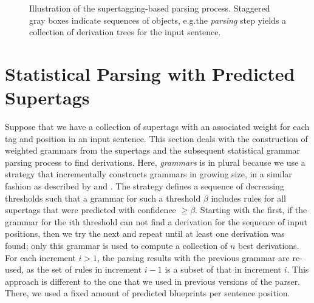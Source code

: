 \documentclass[../document.tex]{subfiles}
\begin{document}
    \begin{figure}
        
        \caption{
            Illustration of the supertagging-based parsing process.
            Staggered gray boxes indicate sequences of objects, e.g.\@ the \emph{parsing} step yields a collection of derivation trees for the input sentence.
        }
    \end{figure}

    \section{Statistical Parsing with Predicted Supertags}\label{sec:parsing}
    Suppose that we have a collection of supertags with an associated weight for each tag and position in an input sentence.
    This section deals with the construction of weighted grammars from the supertags and the subsequent statistical grammar parsing process to find derivations.
    Here, \emph{grammars} is in plural because we use a strategy that incrementally constructs grammars in growing size, in a similar fashion as described by \citet[Section 5.1]{Clark04} and \cite[Section 2.2.2]{Auli12}.
    The strategy defines a sequence of decreasing thresholds such that a grammar for such a threshold \(\beta\) includes rules for all supertags that were predicted with confidence \(\ge \beta\).
    Starting with the first, if the grammar for the \(i\)th threshold can not find a derivation for the sequence of input positions, then we try the next and repeat until at least one derivation was found; only this grammar is used to compute a collection of \(n\) best derivations.
    For each increment \(i > 1\), the parsing results with the previous grammar are re-used, as the set of rules in increment \(i-1\) is a subset of that in increment \(i\).
    This approach is different to the one that we used in previous versions of the parser. \citep{RupMoe21, Rup22}
    There, we used a fixed amount of predicted blueprints per sentence position.
\end{document}
